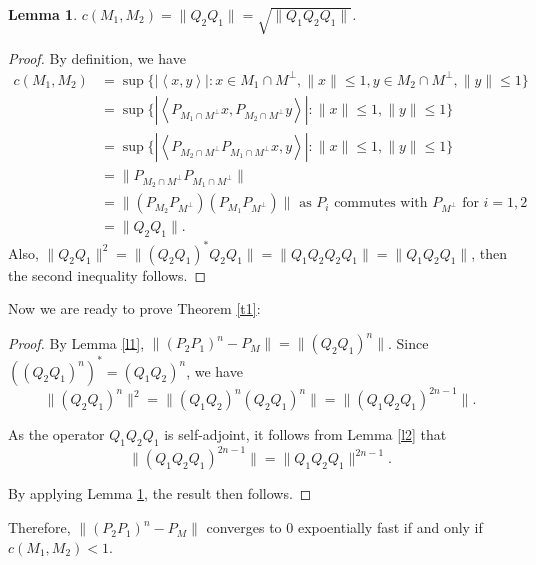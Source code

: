 \documentclass[11pt, a4paper]{amsart}
\newtheorem{lemma}[theorem]{Lemma}
\begin{document}
\begin{lemma}\label{l3}
$c(M_1,M_2)=\|Q_2Q_1\|=\sqrt{\|Q_1Q_2Q_1\|}$.
\end{lemma}
\begin{proof}
By definition, we have
\begin{align*}
c(M_1,M_2)&=\sup\{|\left\langle x,y\right\rangle|\colon x\in M_{1}\cap M^{\perp}, \|x\|\leq 1, y\in M_2\cap M^{\perp},\|y\|\leq 1\}\\
{}&=\sup\{|\left\langle P_{M_1\cap M^{\perp}}x, P_{M_2\cap M^{\perp}}y\right\rangle|\colon \|x\|\leq 1,\|y\|\leq 1\}\\
{}&=\sup\{|\left\langle P_{M_2\cap M^{\perp}}P_{M_1\cap M^{\perp}}x, y\right\rangle|\colon \|x\|\leq 1,\|y\|\leq 1\}\\
{}&=\|P_{M_2\cap M^{\perp}}P_{M_1\cap M^{\perp}}\|\\
{}&=\|(P_{M_2}P_{M^{\perp}})(P_{M_1}P_{M^{\perp}})\| \mbox{ as } P_{i} \mbox{ commutes with } P_{M^{\perp}} \mbox{ for } i=1,2 \\
{}&=\|Q_2Q_1\|.
\end{align*}
Also, $\|Q_2Q_1\|^2=\|(Q_2Q_1)^{\ast}Q_2Q_1\|=\|Q_1Q_2Q_2Q_1\|=\|Q_1Q_2Q_1\|$, then the second inequality follows.
\end{proof}
Now we are ready to prove Theorem \ref{t1}:
\begin{proof}
By Lemma \ref{l1}, $\|(P_2P_1)^n-P_M\|=\|(Q_2Q_1)^n\|$. Since $((Q_2Q_1)^n)^{\ast}=(Q_1Q_2)^n$, we have 
$$\|(Q_2Q_1)^n\|^2=\|(Q_1Q_2)^n(Q_2Q_1)^n\|=\|(Q_1Q_2Q_1)^{2n-1}\|.$$

As the operator $Q_1Q_2Q_1$ is self-adjoint, it follows from Lemma \ref{l2} that $$\|(Q_1Q_2Q_1)^{2n-1}\|=\|Q_1Q_2Q_1\|^{2n-1}.$$

By applying Lemma \ref{l3}, the result then follows.
\end{proof}
Therefore, $\|(P_2P_1)^n-P_M\|$ converges to $0$ expoentially fast if and only if $c(M_1,M_2)<1$.
\par
\end{document}
